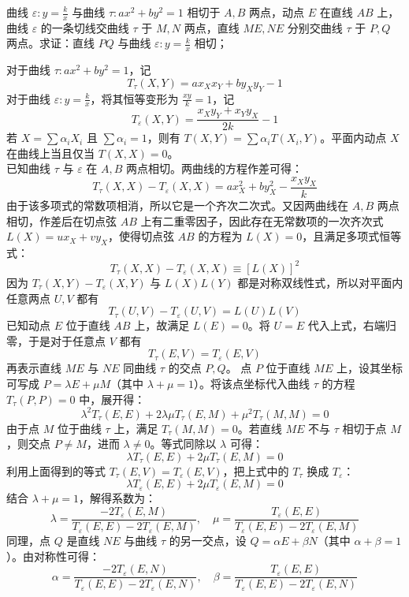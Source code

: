 \begin{example}
曲线 $\varepsilon: y = \frac{k}{x}$ 与曲线 $\tau: ax^2 + by^2 = 1$ 相切于 $A,B$ 两点，动点 $E$ 在直线 $AB$ 上，曲线 $\varepsilon$ 的一条切线交曲线 $\tau$ 于 $M,N$ 两点，直线 $ME,NE$ 分别交曲线 $\tau$ 于 $P,Q$ 两点。求证：直线 $PQ$ 与曲线 $\varepsilon: y = \frac{k}{x}$ 相切；
\end{example}
\begin{solution}
对于曲线 $\tau: ax^2 + by^2 = 1$，记
\[ T_\tau(X,Y) = a x_X x_Y + b y_X y_Y - 1 \]
对于曲线 $\varepsilon: y = \frac{k}{x}$，将其恒等变形为 $\frac{xy}{k} = 1$，记
\[ T_\varepsilon(X,Y) = \frac{x_X y_Y + x_Y y_X}{2k} - 1 \]
若 $X = \sum \alpha_i X_i$ 且 $\sum \alpha_i = 1$，则有 $T(X, Y) = \sum \alpha_i T(X_i, Y)$。平面内动点 $X$ 在曲线上当且仅当 $T(X,X) = 0$。\\
已知曲线 $\tau$ 与 $\varepsilon$ 在 $A, B$ 两点相切。两曲线的方程作差可得：
\[ T_\tau(X,X) - T_\varepsilon(X,X) = a x_X^2 + b y_X^2 - \frac{x_X y_X}{k} \]
由于该多项式的常数项相消，所以它是一个齐次二次式。又因两曲线在 $A,B$ 两点相切，作差后在切点弦 $AB$ 上有二重零因子，因此存在无常数项的一次齐次式 $L(X)=u x_X+v y_X$，使得切点弦 $AB$ 的方程为 $L(X)=0$，且满足多项式恒等式：
\[ T_\tau(X,X) - T_\varepsilon(X,X) \equiv [L(X)]^2 \]
因为 $T_\tau(X,Y) - T_\varepsilon(X,Y)$ 与 $L(X)L(Y)$ 都是对称双线性式，所以对平面内任意两点 $U, V$ 都有
\[ T_\tau(U,V) - T_\varepsilon(U,V) = L(U)L(V) \]
已知动点 $E$ 位于直线 $AB$ 上，故满足 $L(E) = 0$。将 $U=E$ 代入上式，右端归零，于是对于任意点 $V$ 都有
\[ T_\tau(E,V) = T_\varepsilon(E,V) \]
再表示直线 $ME$ 与 $NE$ 同曲线 $\tau$ 的交点 $P,Q$。
点 $P$ 位于直线 $ME$ 上，设其坐标可写成 $P = \lambda E + \mu M$（其中 $\lambda + \mu = 1$）。将该点坐标代入曲线 $\tau$ 的方程 $T_\tau(P,P) = 0$ 中，展开得：
\[ \lambda^2 T_\tau(E,E) + 2\lambda\mu T_\tau(E,M) + \mu^2 T_\tau(M,M) = 0 \]
由于点 $M$ 位于曲线 $\tau$ 上，满足 $T_\tau(M,M) = 0$。若直线 $ME$ 不与 $\tau$ 相切于点 $M$，则交点 $P \neq M$，进而 $\lambda \neq 0$。等式同除以 $\lambda$ 可得：
\[ \lambda T_\tau(E,E) + 2\mu T_\tau(E,M) = 0 \]
利用上面得到的等式 $T_\tau(E,V) = T_\varepsilon(E,V)$，把上式中的 $T_\tau$ 换成 $T_\varepsilon$：
\[ \lambda T_\varepsilon(E,E) + 2\mu T_\varepsilon(E,M) = 0 \]
结合 $\lambda + \mu = 1$，解得系数为：
\[ \lambda = \frac{-2T_\varepsilon(E,M)}{T_\varepsilon(E,E) - 2T_\varepsilon(E,M)}, \quad \mu = \frac{T_\varepsilon(E,E)}{T_\varepsilon(E,E) - 2T_\varepsilon(E,M)} \]
同理，点 $Q$ 是直线 $NE$ 与曲线 $\tau$ 的另一交点，设 $Q = \alpha E + \beta N$（其中 $\alpha + \beta = 1$）。由对称性可得：
\[ \alpha = \frac{-2T_\varepsilon(E,N)}{T_\varepsilon(E,E) - 2T_\varepsilon(E,N)}, \quad \beta = \frac{T_\varepsilon(E,E)}{T_\varepsilon(E,E) - 2T_\varepsilon(E,N)} \]

\end{solution}
